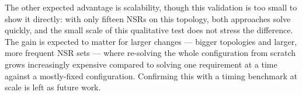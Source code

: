 The other expected advantage is scalability, though this validation is too small to show it directly: with only fifteen NSRs on this topology, both approaches solve quickly, and the small scale of this qualitative test does not stress the difference. The gain is expected to matter for larger changes — bigger topologies and larger, more frequent NSR sets — where re-solving the whole configuration from scratch grows increasingly expensive compared to solving one requirement at a time against a mostly-fixed configuration. Confirming this with a timing benchmark at scale is left as future work.
